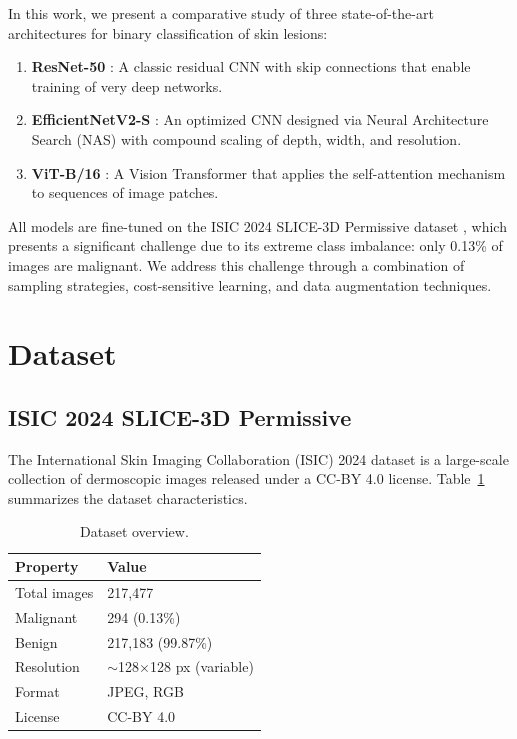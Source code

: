 \documentclass[11pt, a4paper, twocolumn]{article}
\begin{document}
In this work, we present a comparative study of three state-of-the-art
architectures for binary classification of skin lesions:

\begin{enumerate}[noitemsep]
    \item \textbf{ResNet-50} \cite{he2016}: A classic residual CNN
          with skip connections that enable training of very deep networks.
    \item \textbf{EfficientNetV2-S} \cite{tan2021}: An optimized CNN
          designed via Neural Architecture Search (NAS) with compound
          scaling of depth, width, and resolution.
    \item \textbf{ViT-B/16} \cite{dosovitskiy2021}: A Vision Transformer
          that applies the self-attention mechanism to sequences of
          image patches.
\end{enumerate}

All models are fine-tuned on the ISIC 2024 SLICE-3D Permissive dataset
\cite{isic2024}, which presents a significant challenge due to its
extreme class imbalance: only 0.13\% of images are malignant. We
address this challenge through a combination of sampling strategies,
cost-sensitive learning, and data augmentation techniques.

\section{Dataset}
\label{sec:dataset}

\subsection{ISIC 2024 SLICE-3D Permissive}

The International Skin Imaging Collaboration (ISIC) 2024 dataset is a
large-scale collection of dermoscopic images released under a CC-BY 4.0
license. Table~\ref{tab:dataset_overview} summarizes the dataset
characteristics.

\begin{table}[H]
    \centering
    \caption{Dataset overview.}
    \label{tab:dataset_overview}
    \begin{tabular}{@{}ll@{}}
        \toprule
        \textbf{Property} & \textbf{Value} \\
        \midrule
        Total images       & 217,477 \\
        Malignant          & 294 (0.13\%) \\
        Benign             & 217,183 (99.87\%) \\
        Resolution         & $\sim$128$\times$128 px (variable) \\
        Format             & JPEG, RGB \\
        License            & CC-BY 4.0 \\
        \bottomrule
    \end{tabular}
\end{table}
\end{document}
